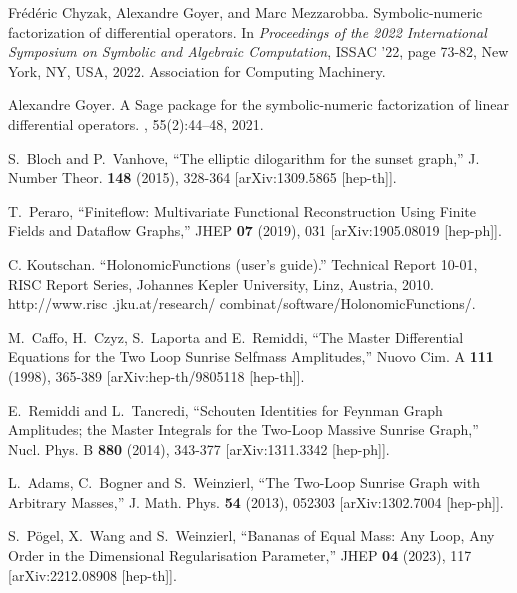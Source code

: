 \documentclass[a4paper,12pt]{article}
\numberwithin{equation}{section}
\numberwithin{figure}{section}
\begin{document}
\begin{thebibliography}{99}
Fr\'{e}d\'{e}ric Chyzak, Alexandre Goyer, and Marc Mezzarobba.
\newblock Symbolic-numeric factorization of differential operators.
\newblock In {\em Proceedings of the 2022 International Symposium on Symbolic
  and Algebraic Computation}, ISSAC '22, page 73-82, New York, NY, USA, 2022.
Association for Computing Machinery.
\newblock [arXiv:2205.08991]

Alexandre Goyer.
\newblock A {S}age package for the symbolic-numeric factorization of linear
  differential operators.
, 55(2):44--48,
2021.

S.~Bloch and P.~Vanhove,
``The elliptic dilogarithm for the sunset graph,''
J. Number Theor. \textbf{148} (2015), 328-364
[arXiv:1309.5865 [hep-th]].
  
T.~Peraro,
``Finiteflow: Multivariate Functional Reconstruction Using Finite Fields and Dataflow Graphs,''
JHEP \textbf{07} (2019), 031
[arXiv:1905.08019 [hep-ph]].


 C. Koutschan. ``HolonomicFunctions (user's guide).'' Technical Report 10-01, RISC Report Series, Johannes Kepler University, Linz, Austria, 2010. http://www.risc
.jku.at/research/ combinat/software/HolonomicFunctions/.

  
M.~Caffo, H.~Czyz, S.~Laporta and E.~Remiddi,
``The Master Differential Equations for the Two Loop Sunrise Selfmass Amplitudes,''
Nuovo Cim. A \textbf{111} (1998), 365-389
[arXiv:hep-th/9805118 [hep-th]].
  
E.~Remiddi and L.~Tancredi,
``Schouten Identities for Feynman Graph Amplitudes; the Master Integrals for the Two-Loop Massive Sunrise Graph,''
Nucl. Phys. B \textbf{880} (2014), 343-377
[arXiv:1311.3342 [hep-ph]].
  
L.~Adams, C.~Bogner and S.~Weinzierl,
``The Two-Loop Sunrise Graph with Arbitrary Masses,''
J. Math. Phys. \textbf{54} (2013), 052303
[arXiv:1302.7004 [hep-ph]].

S.~P\"ogel, X.~Wang and S.~Weinzierl,
``Bananas of Equal Mass: Any Loop, Any Order in the Dimensional Regularisation Parameter,''
JHEP \textbf{04} (2023), 117
[arXiv:2212.08908 [hep-th]].

 


\end{thebibliography}
\end{document}

